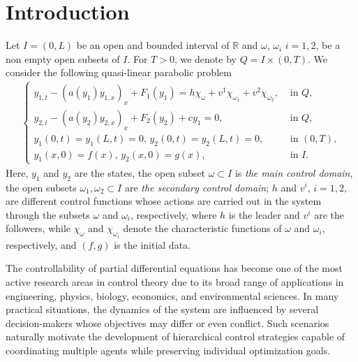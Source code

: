 \documentclass[11pt,a4paper]{amsart}
\numberwithin{equation}{section}
\begin{document}
\date{}

\maketitle

\section{ \bf Introduction } 
Let $I=(0,L)$  be an open and bounded interval of $\mathbb{R}$ and $\omega$,  $\omega_i$ $i=1, 2$, be a non empty open subsets of
$I$. For $T>0$, we denote by $Q=I\times(0,T)$. We consider  the following 
quasi-linear parabolic problem 
\begin{align}
	\begin{cases}	\label{Eq1}	
		y_{1,t}-
        (a(y_1)y_{1,x})_x + F_1(y_1)   = h\chi_\omega+v^1\chi_{\omega_1}+v^2\chi_{\omega_2}, &\text{ in } Q,\\  
		y_{2,t}-
        (a(y_2)y_{2,x})_x + F_2(y_2) + c y_1 = 0, &\text{ in } Q,\\  
        y_1(0,t) = y_1(L,t) =0,\,  y_2(0,t) = y_2(L,t) = 0, &\text{ in } (0,T), \\
        y_1(x,0) = f(x), \,  y_2(x,0) = g(x),  &\text{ in } I.
	\end{cases}
\end{align}Here, $y_1$ and $y_2$ are the states, the open subset $\omega \subset I$ is \emph{the main control domain}, the open subsets $\omega_1, \omega_2 \subset I$ are \emph{the secondary control domain}; $h$ and  $v^i$, $i=1,2$, are different
control functions whose actions are carried out in the system through the  subsets $\omega$  and $\omega_i$, respectively, where $h$ is the leader and $v^i$ are the followers,  while $\chi_{\omega}$ and $\chi_{\omega_i}$ denote the characteristic functions of $\omega$ and $\omega_i$, respectively, and  $(f, g)$ is the  initial data.

The controllability of partial differential equations has become one of the most active research areas in control theory due to its broad range of applications in engineering, physics, biology, economics, and environmental sciences. In many practical situations, the dynamics of the system are influenced by several decision-makers whose objectives may differ or even conflict. Such scenarios naturally motivate the development of hierarchical control strategies capable of coordinating multiple agents while preserving individual optimization goals.
\end{document}
